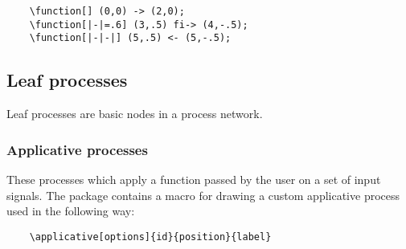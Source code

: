 \documentclass[10pt]{article}
\begin{document}
\begin{verbatim}
	\function[] (0,0) -> (2,0);
	\function[|-|=.6] (3,.5) fi-> (4,-.5);
	\function[|-|-|] (5,.5) <- (5,-.5);
\end{verbatim}

\begin{figure}[htb!]\centering
{}
\end{figure}

\subsection{Leaf processes}

Leaf processes are basic nodes in a process network.

\subsubsection{Applicative processes} \label{tikz_applicative}

These processes which apply a function passed by the user on a set of input signals. The package contains a macro for drawing a custom applicative process used in the following way:

\begin{verbatim}
	\applicative[options]{id}{position}{label}
\end{verbatim}
\end{document}
